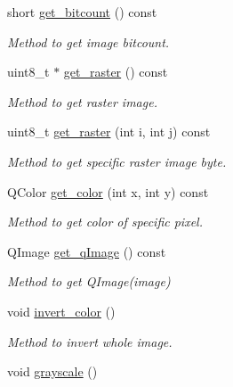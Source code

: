 \begin{DoxyCompactItemize}
short \hyperlink{classBmp__image24_acc7ce112f71be8700cddc7f36497b277}{get\+\_\+bitcount} () const 
\begin{DoxyCompactList}\small\item\em Method to get image bitcount. \end{DoxyCompactList}\item 
uint8\+\_\+t $\ast$ \hyperlink{classBmp__image24_aef9db2ede36ec54d6bfe2953f316e392}{get\+\_\+raster} () const 
\begin{DoxyCompactList}\small\item\em Method to get raster image. \end{DoxyCompactList}\item 
uint8\+\_\+t \hyperlink{classBmp__image24_a04175227264dc0265fcff2897ce496d0}{get\+\_\+raster} (int i, int j) const 
\begin{DoxyCompactList}\small\item\em Method to get specific raster image byte. \end{DoxyCompactList}\item 
Q\+Color \hyperlink{classBmp__image24_a54dae200ec1977ebe1c1cd003f99cb33}{get\+\_\+color} (int x, int y) const 
\begin{DoxyCompactList}\small\item\em Method to get color of specific pixel. \end{DoxyCompactList}\item 
Q\+Image \hyperlink{classBmp__image24_a97c3e041a9427a654ed6ab320cb74254}{get\+\_\+q\+Image} () const 
\begin{DoxyCompactList}\small\item\em Method to get Q\+Image(image) \end{DoxyCompactList}\item 
void \hyperlink{classBmp__image24_a553978a84f1a1f62603eb2c600750ded}{invert\+\_\+color} ()\hypertarget{classBmp__image24_a553978a84f1a1f62603eb2c600750ded}{}\label{classBmp__image24_a553978a84f1a1f62603eb2c600750ded}

\begin{DoxyCompactList}\small\item\em Method to invert whole image. \end{DoxyCompactList}\item 
void \hyperlink{classBmp__image24_aac363ae368760d843885404c74b4b643}{grayscale} ()\hypertarget{classBmp__image24_aac363ae368760d843885404c74b4b643}{}\label{classBmp__image24_aac363ae368760d843885404c74b4b643}


\end{DoxyCompactItemize}
